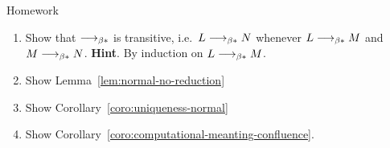 \begin{frame}{Homework}
  \begin{enumerate}
    \item Show that $\longrightarrow_{\beta*}$ is transitive, i.e.\
      $L \longrightarrow_{\beta*} N$ whenever $L \longrightarrow_{\beta*} M$ and $M \longrightarrow_{\beta*} N$. 
      \textbf{Hint}. By induction on $L \longrightarrow_{\beta*} M$.
    \item Show Lemma~\ref{lem:normal-no-reduction}
    \item Show Corollary~\ref{coro:uniqueness-normal}
    \item Show Corollary~\ref{coro:computational-meanting-confluence}.
  \end{enumerate}
\end{frame}
%
%


%  
%   


